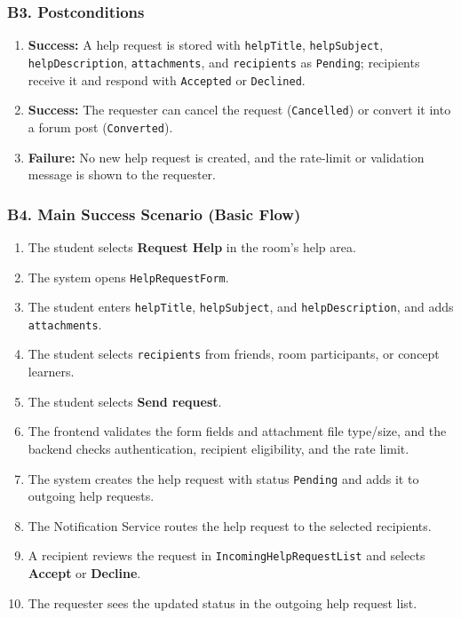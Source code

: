 \documentclass[12pt]{article}
\begin{document}
\subsubsection*{B3. Postconditions}
\par\medskip

\begin{enumerate}
\item \textbf{Success:} A help request is stored with \texttt{helpTitle}, \texttt{helpSubject}, \texttt{helpDescription}, \texttt{attachments}, and \texttt{recipients} as \texttt{Pending}; recipients receive it and respond with \texttt{Accepted} or \texttt{Declined}.
\item \textbf{Success:} The requester can cancel the request (\texttt{Cancelled}) or convert it into a forum post (\texttt{Converted}).
\item \textbf{Failure:} No new help request is created, and the rate-limit or validation message is shown to the requester.
\end{enumerate}
\par\medskip

\hypertarget{sec:b4-main-success-scenario-basic-flow}{}
\subsubsection*{B4. Main Success Scenario (Basic Flow)}
\par\medskip

\begin{enumerate}
\item The student selects \textbf{Request Help} in the room's help area.
\item The system opens \texttt{HelpRequestForm}.
\item The student enters \texttt{helpTitle}, \texttt{helpSubject}, and \texttt{helpDescription}, and adds \texttt{attachments}.
\item The student selects \texttt{recipients} from friends, room participants, or concept learners.
\item The student selects \textbf{Send request}.
\item The frontend validates the form fields and attachment file type/size, and the backend checks authentication, recipient eligibility, and the rate limit.
\item The system creates the help request with status \texttt{Pending} and adds it to outgoing help requests.
\item The Notification Service routes the help request to the selected recipients.
\item A recipient reviews the request in \texttt{IncomingHelpRequestList} and selects \textbf{Accept} or \textbf{Decline}.
\item The requester sees the updated status in the outgoing help request list.
\end{enumerate}
\par\medskip
\end{document}
